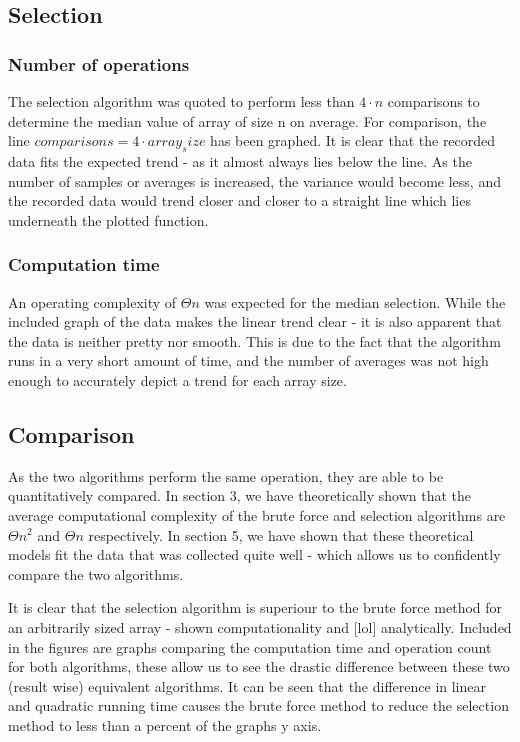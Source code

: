 \documentclass{article}
\begin{document}
    \subsection{Selection}
        \subsubsection{Number of operations}
            The selection algorithm was quoted to perform less than $4 \cdot n$ comparisons to determine the median value of array of size n on average. For comparison, the line $comparisons = 4 \cdot array_size$ has been graphed. It is clear that the recorded data fits the expected trend - as it almost always lies below the line. As the number of samples or averages is increased, the variance would become less, and the recorded data would trend closer and closer to a straight line which lies underneath the plotted function.
        \subsubsection{Computation time}
            An operating complexity of $\Theta{n}$ was expected for the median selection. While the included graph of the data makes the linear trend clear - it is also apparent that the data is neither pretty nor smooth. This is due to the fact that the algorithm runs in a very short amount of time, and the number of averages was not high enough to accurately depict a trend for each array size. 
    \subsection{Comparison}
        As the two algorithms perform the same operation, they are able to be quantitatively compared. In section 3, we have theoretically shown that the average computational complexity of the brute force and selection algorithms are $\Theta{n^2}$ and $\Theta{n}$ respectively. In section 5, we have shown that these theoretical models fit the data that was collected quite well - which allows us to confidently compare the two algorithms.

        It is clear that the selection algorithm is superiour to the brute force method for an arbitrarily sized array - shown computationality and [lol] analytically. Included in the figures are graphs comparing the computation time and operation count for both algorithms, these allow us to see the drastic difference between these two (result wise) equivalent algorithms. It can be seen that the difference in linear and quadratic running time causes the brute force method to reduce the selection method to less than a percent of the graphs y axis.
\newpage
\end{document}
